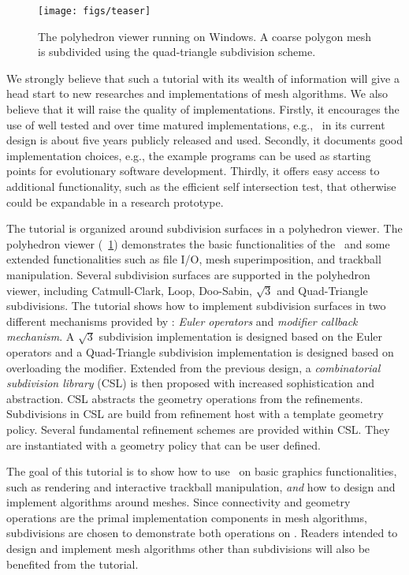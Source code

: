 \documentclass[twocolumn]{article}
\begin{document}
\begin{figure}[h]
  \centering
  \texttt{[image: figs/teaser]}
  \caption{The polyhedron viewer running on Windows. A coarse polygon 
    mesh is subdivided using the quad-triangle subdivision scheme.}
  \label{fig:viewer}
\end{figure}

We strongly believe that such a tutorial with its wealth of
information will give a head start to new researches and implementations
of mesh algorithms. We also believe that it will raise the quality of
implementations. Firstly, it encourages the use of well tested and
over time matured implementations, e.g., \cgalpoly\ in its current
design is about five years publicly released and used. Secondly, it
documents good implementation choices, e.g., the example programs can
be used as starting points for evolutionary software development.
Thirdly, it offers easy access to additional functionality, such as
the efficient self intersection test, that otherwise could be
expandable in a research prototype.

The tutorial is organized around subdivision surfaces in a 
polyhedron viewer. The polyhedron viewer
(\figurename\ \ref{fig:viewer}) demonstrates the basic functionalities of
the \cgalpoly\ and some extended functionalities such as file I/O,
mesh superimposition, and trackball manipulation. Several subdivision
surfaces are supported in the polyhedron viewer, including
Catmull-Clark, Loop, Doo-Sabin, $\sqrt{3}$ and Quad-Triangle
subdivisions.  The tutorial shows how to implement subdivision
surfaces in two different mechanisms provided by \cgalpoly :
\emph{Euler operators} and \emph{modifier callback mechanism}.  A
$\sqrt{3}$ subdivision implementation is designed based on the Euler
operators and a Quad-Triangle subdivision implementation is designed
based on overloading the modifier.  Extended from the previous design,
a \emph{combinatorial subdivision library} (CSL) is then proposed with
increased sophistication and abstraction. CSL abstracts the geometry
operations from the refinements. Subdivisions in CSL are build from
refinement host with a template geometry policy. Several fundamental
refinement schemes are provided within CSL. They are instantiated with a
geometry policy that can be user defined.

The goal of this tutorial is to show how to use \cgalpoly\ 
on basic graphics functionalities, such as rendering and 
interactive trackball manipulation, \emph{and} how to design and 
implement algorithms around meshes. Since connectivity and 
geometry operations are the primal implementation components
in mesh algorithms, subdivisions are chosen to
demonstrate both operations on \cgalpoly . 
Readers intended to design and implement 
mesh algorithms other than subdivisions will also be 
benefited from the tutorial.
\end{document}
